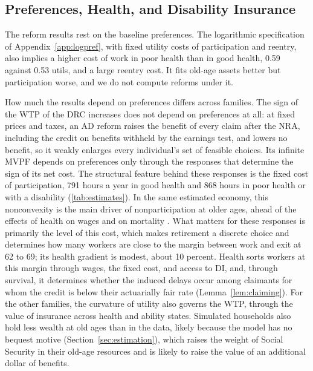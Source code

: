 \subsection{Preferences, Health, and Disability Insurance}\label{sec:disc_prefs}

The reform results rest on the baseline preferences. The logarithmic specification of Appendix~\ref{app:logpref}, with fixed utility costs of participation and reentry, also implies a higher cost of work in poor health than in good health, 0.59 against 0.53 utils, %
and a large reentry cost. It fits old-age assets better but participation worse, and we do not compute reforms under it.

How much the results depend on preferences differs across families. The sign of the WTP of the DRC increases does not depend on preferences at all: at fixed prices and taxes, an AD reform raises the benefit of every claim after the NRA, including the credit on benefits withheld by the earnings test, and lowers no benefit, so it weakly enlarges every individual's set of feasible choices. Its infinite MVPF depends on preferences only through the responses that determine the sign of its net cost. The structural feature behind these responses is the fixed cost of participation, 791 hours a year in good health and 868 hours in poor health or with a disability (\autoref{tab:estimates}). In the same estimated economy, this nonconvexity is the main driver of nonparticipation at older ages, ahead of the effects of health on wages and on mortality \citep{NdiayeYu2026frot}. What matters for these responses is primarily the level of this cost, which makes retirement a discrete choice and determines how many workers are close to the margin between work and exit at 62 to 69; its health gradient is modest, about 10 percent. %
Health sorts workers at this margin through wages, the fixed cost, and access to DI, and, through survival, it determines whether the induced delays occur among claimants for whom the credit is below their actuarially fair rate (Lemma~\ref{lem:claiming}). For the other families, the curvature of utility also governs the WTP, through the value of insurance across health and ability states. Simulated households also hold less wealth at old ages than in the data, likely because the model has no bequest motive (Section~\ref{sec:estimation}), which raises the weight of Social Security in their old-age resources and is likely to raise the value of an additional dollar of benefits.

